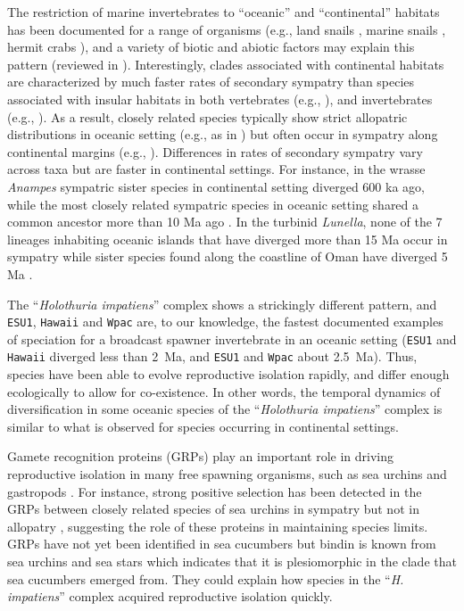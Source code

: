 \documentclass[12pt,letterpaper]{article}\usepackage[]{graphicx}\usepackage[]{color}
\begin{document}
The restriction of marine invertebrates to ``oceanic'' and ``continental''
habitats has been documented for a range of organisms (e.g., land snails
\citep{Paulay1994}, marine snails \citep{Abbott1960, Reid2006b, Williams2011},
hermit crabs \citep{Malay2010}), and a variety of biotic and abiotic factors may
explain this pattern (reviewed in \citep{Malay2010}). Interestingly, clades
associated with continental habitats are characterized by much faster rates of
secondary sympatry than species associated with insular habitats in both
vertebrates (e.g., \citep{Taylor2005, Hodge2012}), and invertebrates (e.g.,
\citep{Meyer2005-evolution, Malay2010, Williams2011}). As a result, closely
related species typically show strict allopatric distributions in oceanic
setting (e.g., as in \citep{Meyer2005-evolution}) but often occur in sympatry
along continental margins (e.g., \citep{Williams2011}). Differences in rates of
secondary sympatry vary across taxa but are faster in continental settings. For
instance, in the wrasse \textit{Anampes} sympatric sister species in continental
setting diverged 600 ka ago, while the most closely related sympatric species in
oceanic setting shared a common ancestor more than 10 Ma ago
\citep{Hodge2012}. In the turbinid \textit{Lunella}, none of the 7 lineages
inhabiting oceanic islands that have diverged more than 15 Ma occur in sympatry
while sister species found along the coastline of Oman have diverged 5 Ma
\citep{Williams2011}.

The ``\textit{Holothuria impatiens}'' complex shows a strickingly different
pattern, and \texttt{ESU1}, \texttt{Hawaii} and \texttt{Wpac} are, to our
knowledge, the fastest documented examples of speciation for a broadcast spawner
invertebrate in an oceanic setting (\texttt{ESU1} and \texttt{Hawaii} diverged
less than 2~Ma, and \texttt{ESU1} and \texttt{Wpac} about 2.5~Ma). Thus, species
have been able to evolve reproductive isolation rapidly, and differ enough
ecologically to allow for co-existence. In other words, the temporal dynamics of
diversification in some oceanic species of the ``\textit{Holothuria impatiens}''
complex is similar to what is observed for species occurring in continental
settings.

Gamete recognition proteins (GRPs) play an important role in driving
reproductive isolation in many free spawning organisms, such as sea urchins
\citep{Levitan2006, Lessios2011} and gastropods \citep{Hellberg2000}. For
instance, strong positive selection has been detected in the GRPs between
closely related species of sea urchins in sympatry but not in allopatry
\citep{Geyer2003}, suggesting the role of these proteins in maintaining species
limits.  GRPs have not yet been identified in sea cucumbers but bindin is known
from sea urchins \citep{Lessios2011} and sea stars \citep{Patino2009} which
indicates that it is plesiomorphic in the clade that sea cucumbers emerged
from. They could explain how species in the ``\textit{H. impatiens}'' complex
acquired reproductive isolation quickly.
\end{document}
